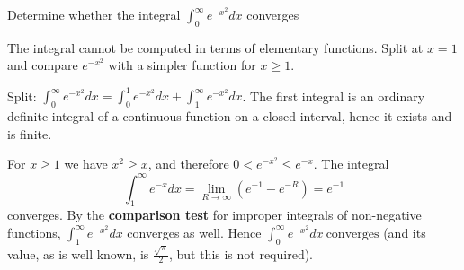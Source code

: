 
\begin{question}
Determine whether the integral $\displaystyle\int_0^\infty e^{-x^2}dx$ converges
\end{question}

\begin{hint}
The integral cannot be computed in terms of elementary functions. Split at $x=1$ and compare $e^{-x^2}$ with a simpler function for $x\ge1$.
\end{hint}

\begin{solution}
Split: $\int_0^\infty e^{-x^2}dx=\int_0^1 e^{-x^2}dx+\int_1^\infty e^{-x^2}dx$.
The first integral is an ordinary definite integral of a continuous function on a closed interval, hence it exists and is finite.

For $x\ge 1$ we have $x^2\ge x$, and therefore $0<e^{-x^2}\le e^{-x}$. The integral
\[ \int_1^\infty e^{-x}dx=\lim_{R\to\infty}\left(e^{-1}-e^{-R}\right)=e^{-1} \]
converges. By the \textbf{comparison test} for improper integrals of non-negative functions, $\int_1^\infty e^{-x^2}dx$ converges as well. Hence $\boxed{\int_0^\infty e^{-x^2}dx\ \text{converges}}$
(and its value, as is well known, is $\frac{\sqrt\pi}{2}$, but this is not required).
\end{solution}

